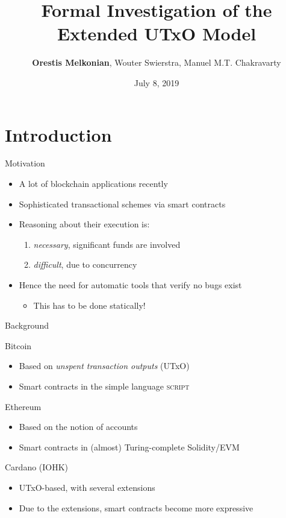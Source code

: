 \documentclass[aspectratio=169]{beamer}
\title{Formal Investigation of the Extended UTxO Model}
\author{\textbf{Orestis Melkonian}, Wouter Swierstra, Manuel M.T. Chakravarty}
\date{July 8, 2019}
\institute{Utrecht University, The Netherlands}
\renewcommand\alert[1]{\textcolor{mLightBrown}{#1}}
\begin{document}
\begin{center}
\maketitle
\end{center}

\section{Introduction}

\begin{frame}{Motivation}
\begin{itemize}
\item A lot of blockchain applications recently
\item Sophisticated transactional schemes via \alert{smart contracts}
\item Reasoning about their execution is:
  \begin{enumerate}
  \item \textit{necessary}, significant funds are involved
  \item \textit{difficult}, due to concurrency
  \end{enumerate}
\item Hence the need for automatic tools that verify no bugs exist
  \begin{itemize}
  \item This has to be done \alert{statically}!
  \end{itemize}
\end{itemize}
\end{frame}

\begin{frame}{Background}

\begin{alertblock}{Bitcoin}
\begin{itemize}
\item Based on \textit{unspent transaction outputs} (UTxO)
\item Smart contracts in the simple language \textsc{script}
\end{itemize}
\end{alertblock}

\begin{alertblock}{Ethereum}
\begin{itemize}
\item Based on the notion of accounts
\item Smart contracts in (almost) Turing-complete Solidity/EVM
\end{itemize}
\end{alertblock}

\begin{alertblock}{Cardano (IOHK)}
\begin{itemize}
\item UTxO-based, with several extensions
\item Due to the extensions, smart contracts become more expressive
\end{itemize}
\end{alertblock}

\end{frame}
\end{document}

